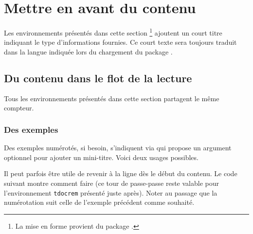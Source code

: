 \documentclass[12pt, a4paper]{article}
\begin{document}
\section{Mettre en avant du contenu}

\begin{tdocnote}
    Les environnements présentés dans cette section
    \footnote{
        La mise en forme provient du package .
    }
    ajoutent un court titre indiquant le type d'informations fournies.
    Ce court texte sera toujours traduit dans la langue indiquée lors du chargement du package \thispack{}.
\end{tdocnote}



\subsection{Du contenu dans le flot de la lecture}




\begin{tdocimp}
    Tous les environnements présentés dans cette section partagent le même compteur.
\end{tdocimp}




\subsubsection{Des exemples}

Des exemples numérotés, si besoin, s'indiquent via  qui propose un argument optionnel pour ajouter un mini-titre.
Voici deux usages possibles.









\begin{tdoctip}
    Il peut parfois être utile de revenir à la ligne dès le début du contenu. Le code suivant montre comment faire (ce tour de passe-passe reste valable pour l'environnement \verb#tdocrem# présenté juste après). Noter au passage que la numérotation suit celle de l'exemple précédent comme souhaité.
\end{tdoctip}

\end{document}
